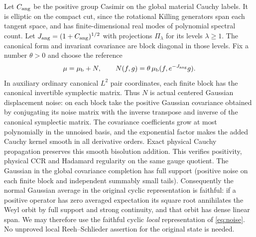 \documentclass[11pt]{article}
\begin{document}
Let \(C_{\rm ang}\) be the positive group Casimir on the global material Cauchy labels. It is elliptic on the compact cut, since the rotational Killing generators span each tangent space, and has finite-dimensional real modes of polynomial spectral count. Let \(J_{\rm ang}=(1+C_{\rm ang})^{1/2}\) with projections \(\Pi_\lambda\) for its levels \(\lambda\ge1\). The canonical form and invariant covariance are block diagonal in those levels. Fix a number \(\theta>0\) and choose the reference
\begin{equation}
 \mu=\mu_{\rm b}+N,\qquad
 N(f,g)=\theta\,\mu_{\rm b}(f,e^{-J_{\rm ang}}g).
 \label{eq:noise}
\end{equation}
In auxiliary ordinary canonical \(L^2\) pair coordinates, each finite block has the canonical invertible symplectic matrix. Thus \(N\) is actual centered Gaussian displacement noise: on each block take the positive Gaussian covariance obtained by conjugating its noise matrix with the inverse transpose and inverse of the canonical symplectic matrix. The covariance coefficients grow at most polynomially in the unnoised basis, and the exponential factor makes the added Cauchy kernel smooth in all derivative orders. Exact physical Cauchy propagation preserves this smooth bisolution addition. This verifies positivity, physical CCR and Hadamard regularity on the same gauge quotient. The Gaussian in the global covariance completion has full support (positive noise on each finite block and independent summably small tails). Consequently the normal Gaussian average in the original cyclic representation is faithful: if a positive operator has zero averaged expectation its square root annihilates the Weyl orbit by full support and strong continuity, and that orbit has dense linear span. We may therefore use the faithful cyclic \emph{local} representation of \eqref{eq:noise}. No unproved local Reeh--Schlieder assertion for the original state is needed.
\end{document}
